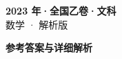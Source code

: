 \documentclass[zihao=-4, a4paper]{ctexart}
\begin{document}
\begin{center}
  {\Large\bfseries 2023 年·全国乙卷·文科}\\[4pt]
  {\large 数学 · 解析版}
\end{center}
\medskip
{}

\clearpage
{}
\begin{center}{\Large\bfseries 参考答案与详细解析}\end{center}
\medskip

\end{document}
